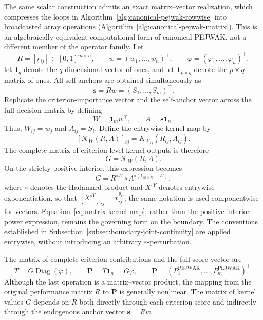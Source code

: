 \documentclass[reqno,11pt]{amsart}
\theoremstyle{definition}
\theoremstyle{plain}
\theoremstyle{remark}
\begin{document}
The same scalar construction admits an exact matrix--vector realization, which
compresses the loops in Algorithm~\ref{alg:canonical-pejwak-rowwise} into
broadcasted array operations (Algorithm~\ref{alg:canonical-pejwak-matrix}). This is an algebraically equivalent computational
form of canonical PEJWAK, not a different member of the operator family. 
Let
\[
R=[r_{ij}]\in[0,1]^{m\times n},
\qquad
w=(w_1,\ldots,w_n)^\top,
\qquad
\varphi=(\varphi_1,\ldots,\varphi_n)^\top,
\]
let \(\mathbf 1_q\) denote the \(q\)-dimensional vector of ones, and let
\(\mathbf 1_{p\times q}\) denote the \(p\times q\) matrix of ones. All
self-anchors are obtained simultaneously as
\begin{equation*}
\mathbf s=Rw=(S_1,\ldots,S_m)^\top.
\end{equation*}
Replicate the criterion-importance vector and the self-anchor vector across
the full decision matrix by defining
\begin{equation*}
W=\mathbf 1_mw^\top,
\qquad
A=\mathbf s\mathbf 1_n^\top.
\end{equation*}
Thus, \(W_{ij}=w_j\) and \(A_{ij}=S_i\). Define the entrywise kernel map by
\[
\left[\mathcal K_W(R,A)\right]_{ij}
=K_{W_{ij}}(R_{ij},A_{ij}).
\]
The complete matrix of criterion-level kernel outputs is therefore
\begin{equation}
G=\mathcal K_W(R,A).
\label{eq:matrix-kernel-map}
\end{equation}
On the strictly positive interior, this expression becomes
\begin{equation*}
G
=
R^{\circ W}
\circ
A^{\circ(\mathbf 1_{m\times n}-W)},
\end{equation*}
where \(\circ\) denotes the Hadamard product and
\(X^{\circ Y}\) denotes entrywise exponentiation, so that
\([X^{\circ Y}]_{ij}=x_{ij}^{y_{ij}}\); the same notation is used
componentwise for vectors. Equation~\eqref{eq:matrix-kernel-map},
rather than the positive-interior power expression, remains the governing form
on the boundary. The conventions established in
Subsection~\ref{subsec:boundary-joint-continuity} are applied entrywise, without
introducing an arbitrary \(\varepsilon\)-perturbation.

The matrix of complete criterion contributions and the full score vector are
\begin{equation}
T=G\operatorname{Diag}(\varphi),
\qquad
\boxed{
\mathbf P
=T\mathbf 1_n
=G\varphi
},
\qquad
\mathbf P
=
\left(
P_1^{\mathrm{PEJWAK}},\ldots,P_m^{\mathrm{PEJWAK}}
\right)^\top.
\label{eq:vectorized-pejwak}
\end{equation}
Although the last operation is a matrix--vector product, the mapping from the
original performance matrix \(R\) to \(\mathbf P\) is generally nonlinear.
The matrix of kernel values \(G\) depends on \(R\) both directly through each criterion
score and indirectly through the endogenous anchor vector \(\mathbf s=Rw\).
\end{document}
